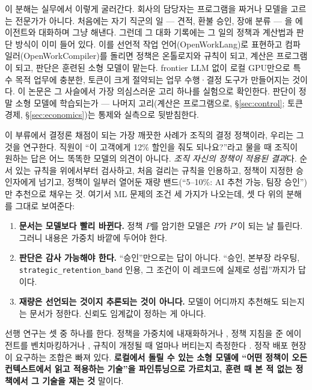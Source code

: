 \documentclass[11pt]{article}
\begin{document}
이 분해는 실무에서 이렇게 굴러간다. 회사의 담당자는 프로그램을 짜거나 모델을 고르는 전문가가 아니다. 처음에는 자기 직군의 일 --- 견적, 환불 승인, 장애 분류 --- 을 에이전트와 대화하며 그냥 해낸다. 그런데 그 대화 기록에는 그 일의 정책과 계산법과 판단 방식이 이미 들어 있다. 이를 선언적 작업 언어(OpenWorkLang)로 표현하고 컴파일러(OpenWorkCompiler)를 돌리면 정책은 온톨로지와 규칙이 되고, 계산은 프로그램이 되고, 판단은 훈련된 소형 모델이 맡는다. frontier LLM 없이 로컬 GPU만으로 특수 목적 업무에 충분한, 토큰이 크게 절약되는 업무 수행·결정 도구가 만들어지는 것이다. 이 논문은 그 사슬에서 가장 의심스러운 고리 하나를 실험으로 확인한다. 판단이 정말 소형 모델에 학습되는가 --- 나머지 고리(계산은 프로그램으로, \S\ref{sec:control}; 토큰 경제, \S\ref{sec:economics})는 통제와 실측으로 뒷받침한다.

이 부류에서 결정론 채점이 되는 가장 깨끗한 사례가 조직의 결정 정책이라, 우리는 그것을 연구한다. 직원이 ``이 고객에게 12\% 할인을 줘도 되나요?''라고 물을 때 조직이 원하는 답은 어느 똑똑한 모델의 의견이 아니다. \emph{조직 자신의 정책이 적용된 결과}다. 순서 있는 규칙을 위에서부터 검사하고, 처음 걸리는 규칙을 인용하고, 정책이 지정한 승인자에게 넘기고, 정책이 일부러 열어둔 재량 밴드(``5--10\%: AI 추천 가능, 팀장 승인'')만 추천으로 채우는 것. 여기서 ML 문제의 조건 세 가지가 나오는데, 셋 다 위의 분해를 그대로 보여준다:

\begin{enumerate}
  \item \textbf{문서는 모델보다 빨리 바뀐다.} 정책 $P$를 암기한 모델은 $P$가 $P'$이 되는 날 틀린다. 그러니 내용은 가중치 바깥에 두어야 한다.
  \item \textbf{판단은 감사 가능해야 한다.} ``승인''만으로는 답이 아니다. ``승인, 본부장 라우팅, \texttt{strategic\_retention\_band} 인용, 그 조건이 이 레코드에 실제로 성립''까지가 답이다.
  \item \textbf{재량은 선언되는 것이지 추론되는 것이 아니다.} 모델이 어디까지 추천해도 되는지는 문서가 정한다. 신뢰도 임계값이 정하는 게 아니다.
\end{enumerate}

선행 연구는 셋 중 하나를 한다. 정책을 가중치에 내재화하거나 \citep{trimpi2025}, 정책 지침을 준 에이전트를 벤치마킹하거나 \citep{taubench2024,rulearena2024}, 규칙이 개정될 때 얼마나 버티는지 측정한다 \citep{guidebench2025}. 정작 배포 현장이 요구하는 조합은 빠져 있다. \textbf{로컬에서 돌릴 수 있는 소형 모델에 ``어떤 정책이 오든 컨텍스트에서 읽고 적용하는 기술''을 파인튜닝으로 가르치고, 훈련 때 본 적 없는 정책에서 그 기술을 재는 것} 말이다.
\end{document}
